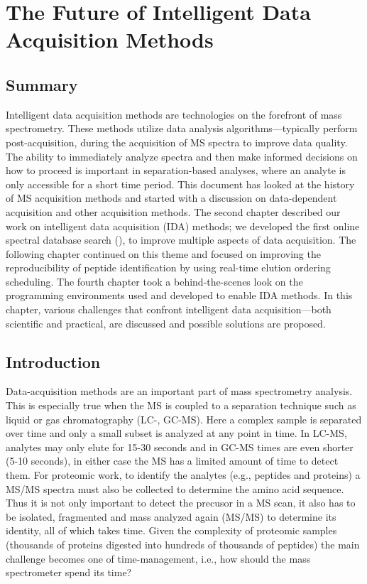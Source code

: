 \chapter{The Future of Intelligent Data Acquisition Methods}

\section{Summary}
Intelligent data acquisition methods are technologies on the forefront of mass spectrometry. These methods utilize data analysis algorithms---typically perform post-acquisition, during the acquisition of MS spectra to improve data quality. The ability to immediately analyze spectra and then make informed decisions on how to proceed is important in separation-based analyses, where an analyte is only accessible for a short time period. This document has looked at the history of MS acquisition methods and started with a discussion on data-dependent acquisition and other acquisition methods. The second chapter described our work on intelligent data acquisition (IDA) methods; we developed the first online spectral database search (\inseq{}), to improve multiple aspects of data acquisition. The following chapter continued on this theme and focused on improving the reproducibility of peptide identification by using real-time elution ordering scheduling. The fourth chapter took a behind-the-scenes look on the programming environments used and developed to enable IDA methods. In this chapter, various challenges that confront intelligent data acquisition---both scientific and practical, are discussed and possible solutions are proposed.

\section{Introduction}
Data-acquisition methods are an important part of mass spectrometry analysis. This is especially true when the MS is coupled to a separation technique such as liquid or gas chromatography (LC-, GC-MS). Here a complex sample is separated over time and only a small subset is analyzed at any point in time. In LC-MS, analytes may only elute for 15-30 seconds and in GC-MS times are even shorter (5-10 seconds), in either case the MS has a limited amount of time to detect them. For proteomic work, to identify the analytes (e.g., peptides and proteins) a MS/MS spectra must also be collected to determine the amino acid sequence. Thus it is not only important to detect the precusor in a MS scan, it also has to be isolated, fragmented and mass analyzed again (MS/MS) to determine its identity, all of which takes time. Given the complexity of proteomic samples (thousands of proteins digested into hundreds of thousands of peptides) the main challenge becomes one of time-management, i.e., how should the mass spectrometer spend its time?

